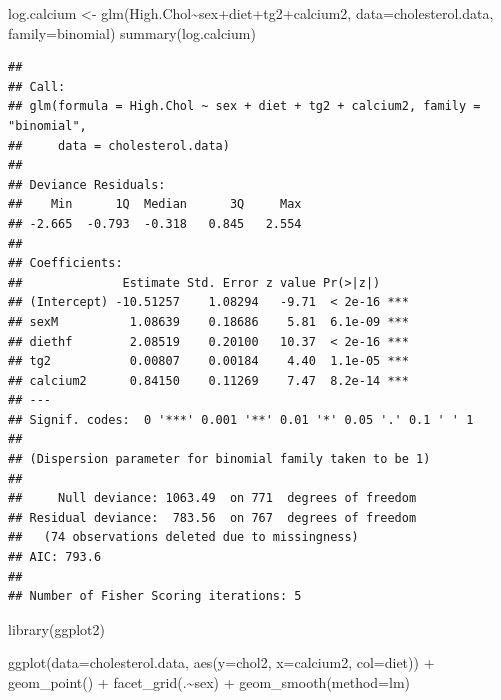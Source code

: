 \documentclass[
]{article}
\newenvironment{Shaded}{\begin{snugshade}}{\end{snugshade}}
\newcommand{\AttributeTok}[1]{\textcolor[rgb]{0.77,0.63,0.00}{#1}}
\newcommand{\FunctionTok}[1]{\textcolor[rgb]{0.00,0.00,0.00}{#1}}
\newcommand{\NormalTok}[1]{#1}
\newcommand{\OtherTok}[1]{\textcolor[rgb]{0.56,0.35,0.01}{#1}}
\newcommand{\SpecialCharTok}[1]{\textcolor[rgb]{0.00,0.00,0.00}{#1}}
\newcommand{\StringTok}[1]{\textcolor[rgb]{0.31,0.60,0.02}{#1}}
\begin{document}
\begin{Shaded}
\begin{Highlighting}[]
\NormalTok{log.calcium }\OtherTok{\textless{}{-}} \FunctionTok{glm}\NormalTok{(High.Chol}\SpecialCharTok{\textasciitilde{}}\NormalTok{sex}\SpecialCharTok{+}\NormalTok{diet}\SpecialCharTok{+}\NormalTok{tg2}\SpecialCharTok{+}\NormalTok{calcium2, }\AttributeTok{data=}\NormalTok{cholesterol.data, }\AttributeTok{family=}\StringTok{\textquotesingle{}binomial\textquotesingle{}}\NormalTok{)}
\FunctionTok{summary}\NormalTok{(log.calcium)}
\end{Highlighting}
\end{Shaded}

\begin{verbatim}
## 
## Call:
## glm(formula = High.Chol ~ sex + diet + tg2 + calcium2, family = "binomial", 
##     data = cholesterol.data)
## 
## Deviance Residuals: 
##    Min      1Q  Median      3Q     Max  
## -2.665  -0.793  -0.318   0.845   2.554  
## 
## Coefficients:
##              Estimate Std. Error z value Pr(>|z|)    
## (Intercept) -10.51257    1.08294   -9.71  < 2e-16 ***
## sexM          1.08639    0.18686    5.81  6.1e-09 ***
## diethf        2.08519    0.20100   10.37  < 2e-16 ***
## tg2           0.00807    0.00184    4.40  1.1e-05 ***
## calcium2      0.84150    0.11269    7.47  8.2e-14 ***
## ---
## Signif. codes:  0 '***' 0.001 '**' 0.01 '*' 0.05 '.' 0.1 ' ' 1
## 
## (Dispersion parameter for binomial family taken to be 1)
## 
##     Null deviance: 1063.49  on 771  degrees of freedom
## Residual deviance:  783.56  on 767  degrees of freedom
##   (74 observations deleted due to missingness)
## AIC: 793.6
## 
## Number of Fisher Scoring iterations: 5
\end{verbatim}

\begin{Shaded}
\begin{Highlighting}[]
\FunctionTok{library}\NormalTok{(ggplot2)}

\FunctionTok{ggplot}\NormalTok{(}\AttributeTok{data=}\NormalTok{cholesterol.data,}
       \FunctionTok{aes}\NormalTok{(}\AttributeTok{y=}\NormalTok{chol2,}
           \AttributeTok{x=}\NormalTok{calcium2,}
           \AttributeTok{col=}\NormalTok{diet)) }\SpecialCharTok{+}
  \FunctionTok{geom\_point}\NormalTok{() }\SpecialCharTok{+}
  \FunctionTok{facet\_grid}\NormalTok{(.}\SpecialCharTok{\textasciitilde{}}\NormalTok{sex) }\SpecialCharTok{+}
  \FunctionTok{geom\_smooth}\NormalTok{(}\AttributeTok{method=}\NormalTok{lm)}
\end{Highlighting}
\end{Shaded}
\end{document}
